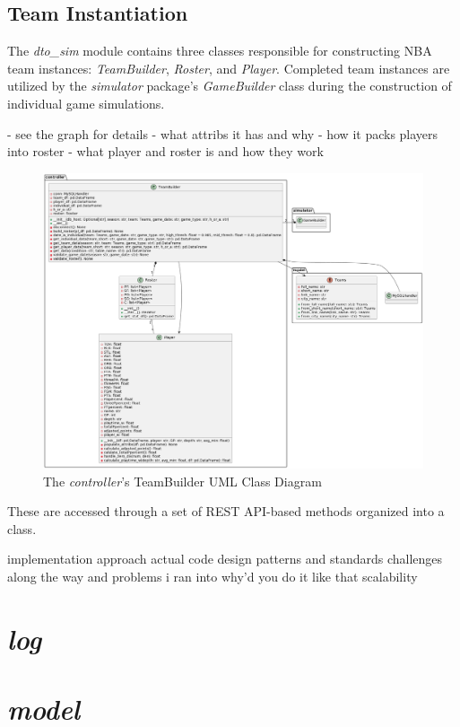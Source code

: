 \documentclass{thesis-ekf}
\theoremstyle{definition}
\theoremstyle{remark}
\begin{document}
\subsection{Team Instantiation}
The \emph{dto\_sim} module contains three classes responsible for constructing NBA team instances: \emph{TeamBuilder}, \emph{Roster}, and \emph{Player}. Completed team instances are utilized by the \emph{simulator} package's \emph{GameBuilder} class during the construction of individual game simulations. 

- see the graph for details
- what attribs it has and why
- how it packs players into roster
- what player and roster is and how they work


\begin{figure}[th!]
	\centering
	\includegraphics[width=1\linewidth]{img/class/controller_teambuild}
	\caption{The \emph{controller}'s TeamBuilder UML Class Diagram}
	\label{img-controller-teambuilder-class}
\end{figure}



These are accessed through a set of REST API-based methods organized into a class. 


implementation approach
actual code
design patterns and standards
challenges along the way and problems i ran into
why'd you do it like that
scalability


\section{\emph{log}}
\section{\emph{model}}
\end{document}
